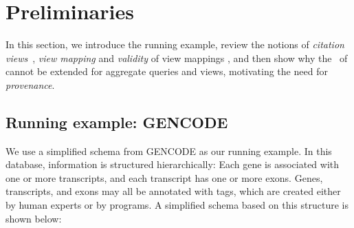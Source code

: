 \section{Preliminaries}\label{Sec: examples}
In this section, we introduce the running example, %
review the notions of \textit{citation views}~\cite{davidson2017model}, {\em view mapping} and {\em validity} of view mappings \cite{wu2018data}, and then show why the \rba\ of \cite{wu2018data} cannot be extended for aggregate queries and views, motivating the need for {\em provenance}.

\subsection{Running example: GENCODE}\label{subsec:running example}



We use a simplified schema from GENCODE as our running example. In this database, information is structured hierarchically: Each gene is associated with one or more transcripts, and each transcript has one or more exons. Genes, transcripts, and exons may all be annotated with tags, which are created either by human experts or by programs. A simplified schema based on this structure is shown below:

